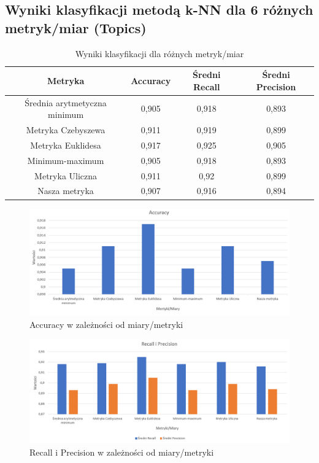 \documentclass{classrep}
\begin{document}
{\subsection{Wyniki klasyfikacji metodą k-NN dla 6 różnych metryk/miar (Topics)}

\begin{table}[h]
\begin{center}
\caption{Wyniki klasyfikacji dla różnych metryk/miar}
\begin{tabular}{|c|c|c|c|}
\hline
\textbf{Metryka}             & \textbf{Accuracy} & \textbf{Średni Recall} & \textbf{Średni Precision} \\ \hline
Średnia arytmetyczna minimum & 0,905             & 0,918                  & 0,893                     \\ \hline
Metryka Czebyszewa           & 0,911             & 0,919                  & 0,899                     \\ \hline
Metryka Euklidesa            & 0,917             & 0,925                  & 0,905                     \\ \hline
Minimum-maximum              & 0,905             & 0,918                  & 0,893                     \\ \hline
Metryka Uliczna              & 0,911             & 0,92                   & 0,899                     \\ \hline
Nasza metryka                & 0,907             & 0,916                  & 0,894                     \\ \hline
\end{tabular}
\end{center}
\end{table}

\begin{figure}[H]
\caption{Accuracy w zależności od miary/metryki}
\centering
\includegraphics[width=1\textwidth]{i9}
\end{figure}

\begin{figure}[H]
\caption{Recall i Precision w zależności od miary/metryki}
\centering
\includegraphics[width=1\textwidth]{i10}
\end{figure}

}
\end{document}
